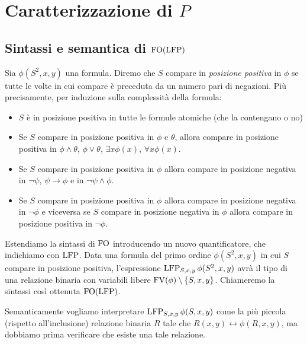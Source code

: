\chapter{Caratterizzazione di $P$}

\section{Sintassi e semantica di $\operatorname{FO}(\operatorname{LFP})$}

\begin{definizione}
 Sia $\phi(S^2,x,y)$ una formula.
 Diremo che $S$ compare in \emph{posizione positiva} in $\phi$ se tutte le volte
 in cui compare è preceduta da un
 numero pari di negazioni. Più precisamente, per induzione sulla complessità
 della formula:
 \begin{itemize}
  \item $S$ è in posizione positiva in tutte le formule atomiche (che la contengano o no)
  \item Se $S$ compare in posizione positiva in $\phi$ e $\theta$, allora compare
  in posizione positiva in $\phi \land \theta$, $\phi \lor \theta$, $\exists x \phi(x)$,
  $\forall x \phi(x)$.
  \item Se $S$ compare in posizione positiva in $\phi$ allora compare in posizione
  negativa in $\lnot \psi$, $\psi \to \phi$ e in $\lnot \psi \land \phi$.
  \item Se $S$ compare in posizione positiva in $\phi$ allora compare in posizione
  negativa in $\lnot \phi$ e viceversa se $S$ compare in posizione negativa in $\phi$
  allora compare in posizione
  positiva in $\lnot \phi$.
 \end{itemize}
\end{definizione}


\begin{definizione}
 Estendiamo la sintassi di $\operatorname{FO}$ introducendo un nuovo quantificatore, che
 indichiamo con $\operatorname{LFP}$. Data una
 formula del primo ordine $\phi(S^2,x,y)$ in cui $S$ compare in posizione positiva,
 l'espressione $\operatorname{LFP}_{S,x,y} \phi(S^2,x,y)$ avrà il tipo di una relazione binaria
 con variabili
 libere $\operatorname{FV}(\phi) \setminus \{S,x,y\}$.
 Chiameremo la sintassi così ottenuta $\operatorname{FO}(\operatorname{LFP})$.
\end{definizione}

Semanticamente vogliamo interpretare $\operatorname{LFP}_{S,x,y} \phi(S,x,y)$ come la più
piccola (rispetto all'inclusione) relazione binaria $R$ tale che $R(x,y) \leftrightarrow \phi(R,x,y)$, ma dobbiamo
prima verificare che esiste una tale relazione.

